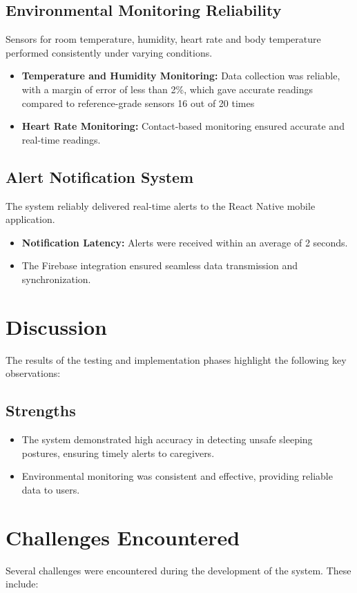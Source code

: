 \documentclass[12pt,a4paper]{report}
\begin{document}
\subsection{Environmental Monitoring Reliability}
Sensors for room temperature, humidity, heart rate and body temperature performed consistently under varying conditions.
\begin{itemize}
    \item \textbf{Temperature and Humidity Monitoring:} Data collection was reliable, with a margin of error of less than 2\%, which gave accurate readings compared to reference-grade sensors 16 out of 20 times
    \item \textbf{Heart Rate Monitoring:} Contact-based monitoring ensured accurate and real-time readings.
\end{itemize}

\subsection{Alert Notification System}
The system reliably delivered real-time alerts to the React Native mobile application.
\begin{itemize}
    \item \textbf{Notification Latency:} Alerts were received within an average of 2 seconds.
    \item The Firebase integration ensured seamless data transmission and synchronization.
\end{itemize}

\section{Discussion}
The results of the testing and implementation phases highlight the following key observations:

\subsection{Strengths}
\begin{itemize}
    \item The system demonstrated high accuracy in detecting unsafe sleeping postures, ensuring timely alerts to caregivers.
    \item Environmental monitoring was consistent and effective, providing reliable data to users.
\end{itemize}
\section{Challenges Encountered}
Several challenges were encountered during the development of the system. These include:
\end{document}

